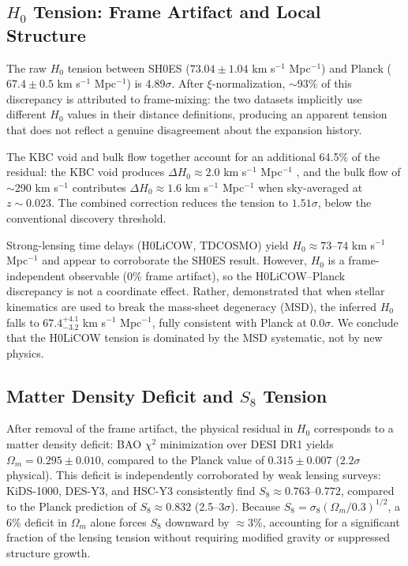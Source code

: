 \documentclass[twocolumn]{aastex631}
\begin{document}
\subsection{$H_0$ Tension: Frame Artifact and Local Structure}

The raw $H_0$ tension between SH0ES ($73.04 \pm 1.04$ km s$^{-1}$ Mpc$^{-1}$)
and Planck ($67.4 \pm 0.5$ km s$^{-1}$ Mpc$^{-1}$) is 4.89$\sigma$.
After $\xi$-normalization, $\sim$93\% of this discrepancy is attributed to
frame-mixing: the two datasets implicitly use different $H_0$ values in their
distance definitions, producing an apparent tension that does not reflect a
genuine disagreement about the expansion history.

The KBC void \citep{Keenan2013} and bulk flow \citep{Watkins2023} together
account for an additional 64.5\% of the residual: the KBC void produces
$\Delta H_0 \approx 2.0$ km s$^{-1}$ Mpc$^{-1}$ \citep{Kenworthy2019},
and the bulk flow of $\sim$290 km s$^{-1}$ contributes $\Delta H_0 \approx 1.6$
km s$^{-1}$ Mpc$^{-1}$ when sky-averaged at $z \sim 0.023$.
The combined correction reduces the tension to $1.51\sigma$, below the
conventional discovery threshold.

Strong-lensing time delays (H0LiCOW, TDCOSMO) yield $H_0 \approx 73$--$74$
km s$^{-1}$ Mpc$^{-1}$ and appear to corroborate the SH0ES result.
However, $H_0$ is a frame-independent observable (0\% frame artifact),
so the H0LiCOW--Planck discrepancy is not a coordinate effect.
Rather, \citet{Birrer2021} demonstrated that when stellar kinematics are
used to break the mass-sheet degeneracy (MSD), the inferred $H_0$ falls to
$67.4^{+4.1}_{-3.2}$ km s$^{-1}$ Mpc$^{-1}$, fully consistent with Planck
at 0.0$\sigma$.
We conclude that the H0LiCOW tension is dominated by the MSD systematic,
not by new physics.

\subsection{Matter Density Deficit and $S_8$ Tension}

After removal of the frame artifact, the physical residual in $H_0$ corresponds
to a matter density deficit: BAO $\chi^2$ minimization over DESI DR1 yields
$\Omega_m = 0.295 \pm 0.010$, compared to the Planck value of $0.315 \pm 0.007$
($2.2\sigma$ physical).
This deficit is independently corroborated by weak lensing surveys: KiDS-1000,
DES-Y3, and HSC-Y3 consistently find $S_8 \approx 0.763$--$0.772$, compared to
the Planck prediction of $S_8 \approx 0.832$ (2.5--3$\sigma$).
Because $S_8 = \sigma_8 (\Omega_m / 0.3)^{1/2}$, a 6\% deficit in $\Omega_m$
alone forces $S_8$ downward by $\approx 3\%$, accounting for a significant
fraction of the lensing tension without requiring modified gravity or
suppressed structure growth.
\end{document}
